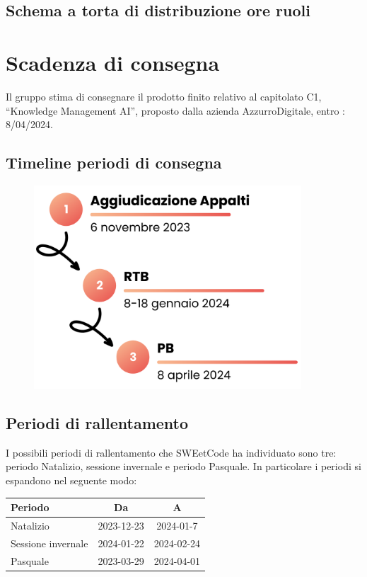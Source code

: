 \documentclass{article}
\begin{document}
{{\subsection{Schema a torta di distribuzione ore ruoli}
    \begin{figure}[!h]
        \centering
        
    \end{figure}

\newpage
\section{Scadenza di consegna}
Il gruppo stima di consegnare il prodotto finito relativo al capitolato C1, “Knowledge Management AI”, proposto dalla azienda AzzurroDigitale, entro : 8/04/2024.

    \subsection{Timeline periodi di consegna}
    \begin{figure}[!h]
        \centering
        \includegraphics[width=10cm]{timeline.png}
    \end{figure}

    \subsection{Periodi di rallentamento}
    I possibili periodi di rallentamento che SWEetCode ha individuato sono tre: periodo Natalizio, sessione invernale e periodo Pasquale.
    In particolare i periodi si espandono nel seguente modo:\\
    \begin{center}
    \begin{tabular}{l|c|c}
         \textbf{Periodo} &  \textbf{Da} & \textbf{A} \\
            \hline Natalizio &  2023-12-23 & 2024-01-7 \\
            \hline Sessione invernale &  2024-01-22 & 2024-02-24 \\
            \hline Pasquale &  2023-03-29 & 2024-04-01 \\
    \end{tabular}
        \end{center}

}}
\end{document}
